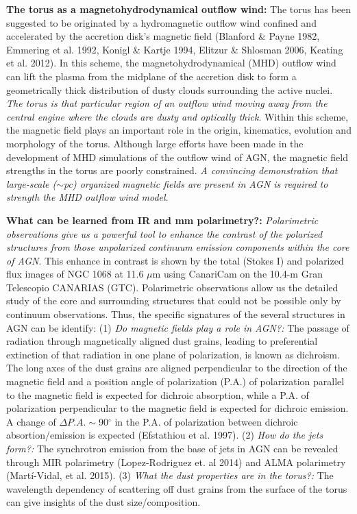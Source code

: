 \documentclass[12pt,a4paper]{article}  %
\begin{document}
\textbf{The torus as a magnetohydrodynamical outflow wind:} The torus has been suggested to be originated by a hydromagnetic outflow wind confined and accelerated by the accretion disk's magnetic field (Blanford \& Payne 1982, Emmering et al. 1992, Konigl \& Kartje 1994, Elitzur \& Shlosman 2006, Keating et al. 2012). In this scheme, the magnetohydrodynamical (MHD) outflow wind can lift the plasma from the midplane of the accretion disk to form a geometrically thick distribution of dusty clouds surrounding the active nuclei. \textit{The torus is that particular region of an outflow wind moving away from the central engine where the clouds are dusty and optically thick}. Within this scheme, the magnetic field plays an important role in the origin, kinematics, evolution and morphology of the torus. Although large efforts have been made in the development of MHD simulations of the outflow wind of AGN, the magnetic field strengths in the torus are poorly constrained. \textit{A convincing demonstration that large-scale ($\sim$pc) organized magnetic fields are present in AGN is required to strength the MHD outflow wind model}. 


\textbf{What can be learned from IR and mm polarimetry?:}  \textit{Polarimetric observations give us a powerful tool to enhance the contrast of the polarized structures from those unpolarized continuum emission components within the core of AGN}. This enhance in contrast is shown by the total (Stokes I) and polarized flux images of NGC 1068 at 11.6 $\mu$m using CanariCam on the 10.4-m Gran Telescopio CANARIAS (GTC). Polarimetric observations allow us the detailed study of the core and surrounding structures that could not be possible only by continuum observations. Thus, the specific signatures of the several structures in AGN can be identify: (1) \textit{Do magnetic fields play a role in AGN?:} The passage of radiation through magnetically aligned dust grains, leading to preferential extinction of that radiation in one plane of polarization, is known as dichroism. The long axes of the dust grains are aligned perpendicular to the direction of the magnetic field and a position angle of polarization (P.A.) of polarization parallel to the magnetic field is expected for dichroic absorption, while a P.A. of polarization perpendicular to the magnetic field is expected for dichroic emission. A change of $\Delta P.A. \sim$90$^{\circ}$ in the P.A. of polarization between dichroic absortion/emission is expected (Efstathiou et al. 1997). (2) \textit{How do the jets form?:} The synchrotron emission from the base of jets in AGN can be revealed through MIR polarimetry (Lopez-Rodriguez et. al 2014) and ALMA polarimetry (Mart\'i-Vidal, et al. 2015). (3) \textit{What the dust properties are in the torus?:} The wavelength dependency of scattering off dust grains from the surface of the torus can give insights of the dust size/composition.
	
\end{document}
